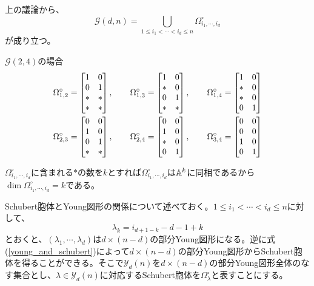 \documentclass{ltjsreport}
\begin{document}
上の議論から、
\[
\mathcal{G}(d,n)=\bigcup_{1\leq i_1<\cdots<i_d\leq n}\Omega^\circ_{i_1,\cdots,i_d}  
\]
が成り立つ。

\begin{eg}
$\mathcal{G}(2,4)$の場合
  \begin{align*}
    &\Omega^\circ_{1,2}=\begin{bmatrix} 
      1 & 0\\
      0 & 1\\
      * & *\\
      * & *
     \end{bmatrix},\qquad 
    \Omega^\circ_{1,3}=\begin{bmatrix} 
      1 & 0\\
      * & 0\\
      0 & 1\\
      * & *
     \end{bmatrix},\qquad
    \Omega^\circ_{1,4}=\begin{bmatrix} 
      1 & 0\\
      * & 0\\
      * & 0\\
      0 & 1
     \end{bmatrix}\\
    &\Omega^\circ_{2,3}=\begin{bmatrix} 
      0 & 0\\
      1 & 0\\
      0 & 1\\
      * & *
     \end{bmatrix},\qquad
    \Omega^\circ_{2,4}=\begin{bmatrix} 
      0 & 0\\
      1 & 0\\
      * & 0\\
      0 & 1
     \end{bmatrix},\qquad
    \Omega^\circ_{3,4}=\begin{bmatrix} 
      0 & 0\\
      0 & 0\\
      1 & 0\\
      0 & 1
     \end{bmatrix}
  \end{align*}
\end{eg}

$\Omega^\circ_{i_1,\cdots,i_d}$に含まれる$*$の数を$k$とすれば$\Omega^\circ_{i_1,\cdots,i_d}$は$\mathbb{A}^k$に同相であるから$\dim\Omega^\circ_{i_1,\cdots,i_d}=k$である。

Schubert胞体とYoung図形の関係について述べておく。$1\leq i_1<\cdots<i_d\leq n$に対して、
\begin{equation}\label{young_and_schubert}
\lambda_{k}=i_{d+1-k}-d-1+k  
\end{equation}
とおくと、$(\lambda_1,\cdots,\lambda_d)$は$d\times (n-d)$の部分Young図形になる。逆に式(\ref{young_and_schubert})によって$d\times (n-d)$の部分Young図形からSchubert胞体を得ることができる。そこで$\mathcal{Y}_d(n)$を$d\times (n-d)$の部分Young図形全体のなす集合とし、$\lambda\in\mathcal{Y}_d(n)$に対応するSchubert胞体を$\Omega^\circ_{\lambda}$と表すことにする。
\end{document}
